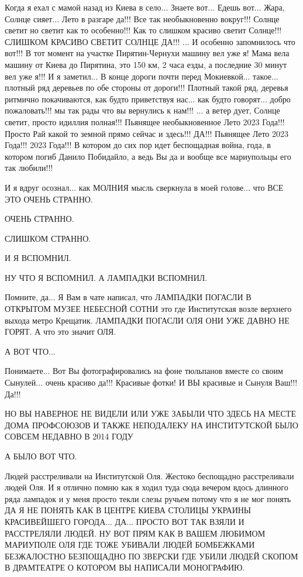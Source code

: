 Когда я ехал с мамой назад из Киева в село... Знаете вот... Едешь вот...  Жара,
Солнце сияет... Лето в разгаре да!!! Все так необыкновенно вокруг!!! Солнце
светит но светит как то особенно!!! Как то слишком красиво светит Солнце!!!
СЛИШКОМ КРАСИВО СВЕТИТ СОЛНЦЕ ДА!!! ... И особенно запомнилось что вот!!!  В
тот момент на участке Пирятин-Чернухи машину вел уже я! Мама вела машину от
Киева до Пирятина, это 150 км, 2 часа езды, а последние 30 минут вел уже я!!! И
я заметил... В конце дороги почти перед Мокиевкой...  такое... плотный ряд
деревьев по обе стороны от дороги!!! Плотный такой ряд, деревья ритмично
покачиваются, как будто приветствуя нас...  как будто говорят... добро
пожаловать!!! мы так рады что вы вернулись к нам!!! ... а ветер дует, Солнце
светит, просто идиллия полная!!! Пьянящее необыкновенное Лето 2023 Года!!!
Просто Рай какой то земной прямо сейчас и здесь!!! ДА!!! Пьянящее Лето 2023
Года!!! 2023 Года!!! В котором до сих пор идет беспощадная война, года, в
котором погиб Данило Побидайло, а ведь Вы да и вообще все мариупольцы его так
любили!!!

И я вдруг осознал... как МОЛНИЯ мысль сверкнула в моей голове... что ВСЕ ЭТО ОЧЕНЬ СТРАННО. 

ОЧЕНЬ СТРАННО.

СЛИШКОМ СТРАННО.

И Я ВСПОМНИЛ.

НУ ЧТО Я ВСПОМНИЛ. А ЛАМПАДКИ ВСПОМНИЛ. 

Помните, да... Я Вам в чате написал, что ЛАМПАДКИ ПОГАСЛИ В ОТКРЫТОМ МУЗЕЕ НЕБЕСНОЙ СОТНИ
это где Институтская возле верхнего выхода метро Крещатик. ЛАМПАДКИ ПОГАСЛИ ОЛЯ
ОНИ УЖЕ ДАВНО НЕ ГОРЯТ. А что это значит ОЛЯ.

А ВОТ ЧТО...

Понимаете... Вот Вы фотографировались на фоне тюльпанов вместе со своим
Сынулей... очень красиво да!!!  Красивые фотки! И ВЫ красивые и Сынуля Ваш!!!
Да!!!

НО ВЫ НАВЕРНОЕ НЕ ВИДЕЛИ ИЛИ УЖЕ ЗАБЫЛИ ЧТО ЗДЕСЬ НА МЕСТЕ ДОМА ПРОФСОЮЗОВ И
ТАКЖЕ НЕПОДАЛЕКУ НА ИНСТИТУТСКОЙ БЫЛО СОВСЕМ НЕДАВНО В 2014 ГОДУ

А БЫЛО ВОТ ЧТО.

Людей расстреливали на Институтской Оля. Жестоко беспощадно расстреливали людей
Оля. И я отлично помню как я ходил туда сюда вечером вдось длинного ряда
лампадок и у меня просто текли слезы ручьем потому что я не мог понять ДА Я НЕ
ПОНЯТЬ КАК В ЦЕНТРЕ КИЕВА СТОЛИЦЫ УКРАИНЫ КРАСИВЕЙШЕГО ГОРОДА... ДА... ПРОСТО
ВОТ ТАК ВЗЯЛИ И РАССТРЕЛЯЛИ ЛЮДЕЙ. НУ ВОТ ПРЯМ КАК В ВАШЕМ ЛЮБИМОМ МАРИУПОЛЕ
ОЛЯ ГДЕ ТОЖЕ УБИВАЛИ ЛЮДЕЙ БОМБЕЖКАМИ БЕЗЖАЛОСТНО БЕЗПОЩАДНО ПО ЗВЕРСКИ ГДЕ УБИЛИ ЛЮДЕЙ СКОПОМ В ДРАМТЕАТРЕ О
КОТОРОМ ВЫ НАПИСАЛИ МОНОГРАФИЮ.

